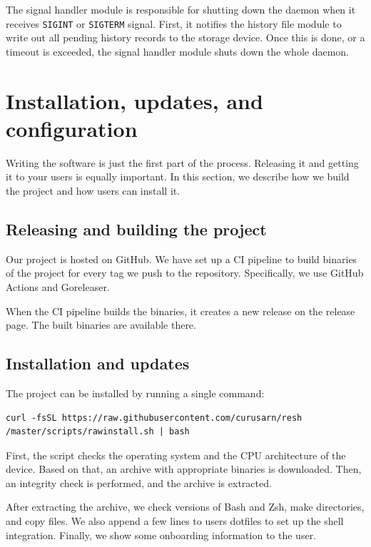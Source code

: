 The signal handler module is responsible for shutting down the daemon when it receives \verb|SIGINT| or \verb|SIGTERM| signal. First, it notifies the history file module to write out all pending history records to the storage device. Once this is done, or a timeout is exceeded, the signal handler module shuts down the whole daemon.


\section{Installation, updates, and configuration}

Writing the software is just the first part of the process. Releasing it and getting it to your users is equally important. In this section, we describe how we build the project and how users can install it.

\subsection{Releasing and building the project}

Our project is hosted on GitHub\cite{resh-github-homepage}. We have set up a CI pipeline to build binaries of the project for every tag we push to the repository. Specifically, we use GitHub Actions\cite{github-actions} and Goreleaser\cite{tools-goreleaser}.

When the CI pipeline builds the binaries, it creates a new release on the release page\cite{resh-github-releases}. The built binaries are available there. 

\subsection{Installation and updates}

The project can be installed by running a single command:

\begin{verbatim}
curl -fsSL https://raw.githubusercontent.com/curusarn/resh
/master/scripts/rawinstall.sh | bash
\end{verbatim}

First, the script checks the operating system and the CPU architecture of the device. Based on that, an archive with appropriate binaries is downloaded. Then, an integrity check is performed, and the archive is extracted. 

After extracting the archive, we check versions of Bash and Zsh, make directories, and copy files. We also append a few lines to users dotfiles to set up the shell integration. Finally, we show some onboarding information to the user.


